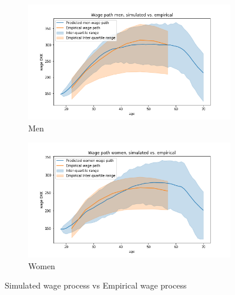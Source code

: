 \begin{figure}[ht]

\begin{subfigure}{.5\textwidth}
  \centering
  \includegraphics[width=1\linewidth]{figures/simulated_wage_path_variance_optimized_parameters_women.png}
  \caption{Men}
  \label{fig:sub1}
\end{subfigure}%
\begin{subfigure}{.5\textwidth}
  \centering
  \includegraphics[width=1\linewidth]{figures/simulated_wage_path_variance_optimized_parameters_men.png}
  \caption{Women}
  \label{fig:sub2_wage_path}
\end{subfigure}
    \caption{Simulated wage process vs Empirical wage process}
    \label{fig:sim_wage_vs_empirical_wage}
\end{figure}\label{sec:parameter_calibration}

